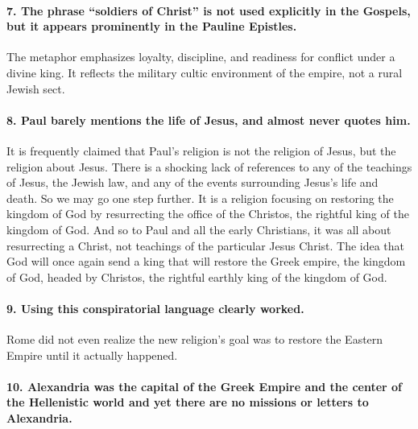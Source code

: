\paragraph{7.
The phrase ``soldiers of Christ'' is not used explicitly in the Gospels, but it appears prominently in the Pauline Epistles.}\label{par:the-phrase-soldiers-of-christ-is-not-used-explicitly-in-the-gospels-but-it-appears-prominently-in-the-pauline-epistles-particularly-in-the-context-of-the-christian-life-being-compared-to-a-military-struggle-or-a-spiritual-battle.}

The metaphor emphasizes loyalty, discipline, and readiness for conflict under a divine king.
It reflects the military cultic environment of the empire, not a rural Jewish sect.

\paragraph{8.
Paul barely mentions the life of Jesus, and almost never quotes him.}\label{par:paul-barely-mentions-the-life-of-jesus-and-almost-never-quotes-him.}

It is frequently claimed that Paul's religion is not the religion of Jesus, but the religion about Jesus.
There is a shocking lack of references to any of the teachings of Jesus, the Jewish law, and any of the events surrounding Jesus's life and death.
So we may go one step further.
It is a religion focusing on restoring the kingdom of God by resurrecting the office of the Christos, the rightful king of the kingdom of God.
And so to Paul and all the early Christians, it was all about resurrecting a Christ, not teachings of the particular Jesus Christ.
The idea that God will once again send a king that will restore the Greek empire, the kingdom of God, headed by Christos, the rightful earthly king of the kingdom of God.

\paragraph{9.
Using this conspiratorial language clearly worked.}\label{par:using-this-conspiratorial-language-clearly-worked}

Rome did not even realize the new religion's goal was to restore the Eastern Empire until it actually happened.

\paragraph{10.
Alexandria was the capital of the Greek Empire and the center of the Hellenistic world and yet there are no missions or letters to Alexandria.}\label{par:alexandria-was-the-capital-of-the-greek-empire-and-the-center-of-the-hellenistic-world-and-yet-there-are-no-missions-or-letters-to-alexandria.}

